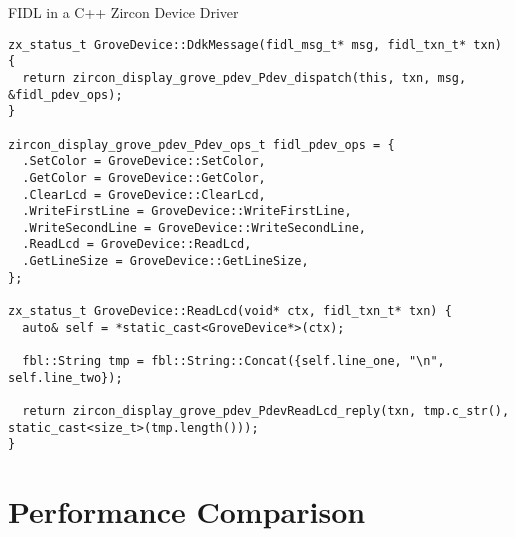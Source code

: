 \begin{listing} [H]
\caption{FIDL in a C++ Zircon Device Driver}
\label{lst:cppmessage}
\begin{verbatim}
zx_status_t GroveDevice::DdkMessage(fidl_msg_t* msg, fidl_txn_t* txn) {
  return zircon_display_grove_pdev_Pdev_dispatch(this, txn, msg, &fidl_pdev_ops);
}

zircon_display_grove_pdev_Pdev_ops_t fidl_pdev_ops = {
  .SetColor = GroveDevice::SetColor,
  .GetColor = GroveDevice::GetColor,
  .ClearLcd = GroveDevice::ClearLcd,
  .WriteFirstLine = GroveDevice::WriteFirstLine,
  .WriteSecondLine = GroveDevice::WriteSecondLine,
  .ReadLcd = GroveDevice::ReadLcd,
  .GetLineSize = GroveDevice::GetLineSize,
};

zx_status_t GroveDevice::ReadLcd(void* ctx, fidl_txn_t* txn) {
  auto& self = *static_cast<GroveDevice*>(ctx);

  fbl::String tmp = fbl::String::Concat({self.line_one, "\n", self.line_two});

  return zircon_display_grove_pdev_PdevReadLcd_reply(txn, tmp.c_str(), static_cast<size_t>(tmp.length()));
}
\end{verbatim}
\end{listing}


 
\section{Performance Comparison}

